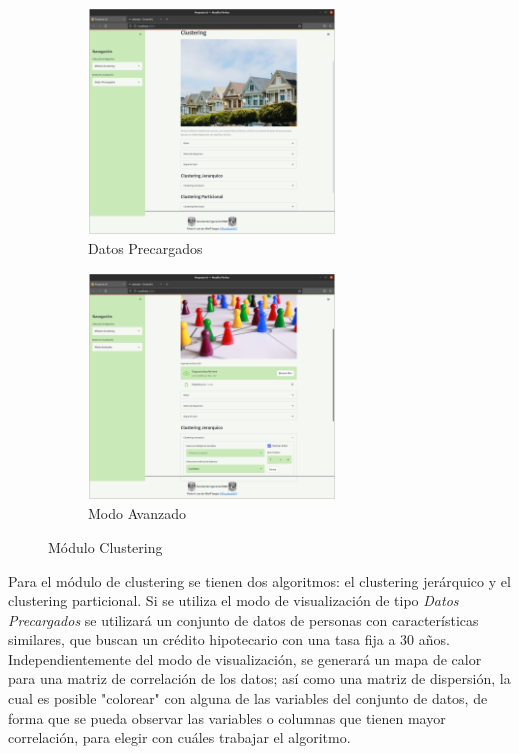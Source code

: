 \documentclass[10pt]{article}
\begin{document}
    \begin{figure}[H]
    \begin{subfigure}{0.5\textwidth}
    \centering
    \includegraphics[height=6cm]{img/ClusteringDP_cerrado.png}
    \caption{Datos Precargados}
    \label{fig:ClusteringDP}
    \end{subfigure}
    \begin{subfigure}{0.5\textwidth}
    \centering
    \includegraphics[height=6cm]{img/ClusteringMA.png}
    \caption{Modo Avanzado}
    \label{fig:ClusteringMA}
    \end{subfigure}
    
    \caption{Módulo Clustering}
    \label{fig:Clustering}
    \end{figure}
    
    Para el módulo de clustering se tienen dos algoritmos: el clustering jerárquico y el clustering particional. Si se utiliza el modo de visualización de tipo \textit{Datos Precargados} se utilizará un conjunto de datos de personas con características similares, que buscan un crédito hipotecario con una tasa fija a 30 años. Independientemente del modo de visualización, se generará un mapa de calor para una matriz de correlación de los datos; así como una matriz de dispersión, la cual es posible "colorear" con alguna de las variables del conjunto de datos, de forma que se pueda observar las variables o columnas que tienen mayor correlación, para elegir con cuáles trabajar el algoritmo.\newline
\end{document}
